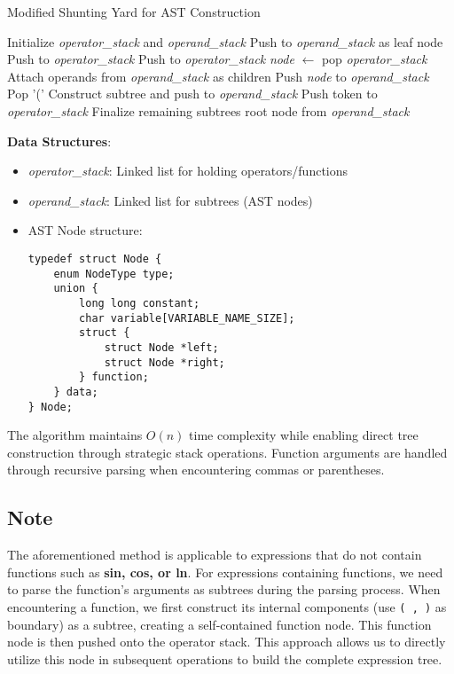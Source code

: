 \documentclass{report}
\begin{document}
\begin{algorithm}[H]
\caption{Modified Shunting Yard for AST Construction}
\begin{algorithmic}[1]
\State Initialize \textit{operator\_stack} and \textit{operand\_stack}
        \State Push to \textit{operand\_stack} as leaf node
        \State Push to \textit{operator\_stack}
        \State Push to \textit{operator\_stack}
            \State \textit{node} $\gets$ pop \textit{operator\_stack}
            \State Attach operands from \textit{operand\_stack} as children
            \State Push \textit{node} to \textit{operand\_stack}
        \EndWhile
        \State Pop '('
    \Else {}
            \State Construct subtree and push to \textit{operand\_stack}
        \EndWhile
        \State Push token to \textit{operator\_stack}
    \EndIf
\EndFor
{}
    \State Finalize remaining subtrees
\EndWhile
\State \Return root node from \textit{operand\_stack}
\end{algorithmic}
\end{algorithm}

\textbf{Data Structures}:
\begin{itemize}
    \item \textit{operator\_stack}: Linked list for holding operators/functions
    \item \textit{operand\_stack}: Linked list for subtrees (AST nodes)
    \item AST Node structure:
    \begin{verbatim}
typedef struct Node {
    enum NodeType type;
    union {
        long long constant;
        char variable[VARIABLE_NAME_SIZE];
        struct {
            struct Node *left;
            struct Node *right;
        } function;
    } data;
} Node;
    \end{verbatim}
\end{itemize}

The algorithm maintains $O(n)$ time complexity while enabling direct tree construction through strategic stack operations. Function arguments are handled through recursive parsing when encountering commas or parentheses.

\subsection*{Note}
The aforementioned method is applicable to expressions that do not contain functions such as \textbf{sin, cos, or ln}. For expressions containing functions, we need to parse the function's arguments as subtrees during the parsing process. When encountering a function, we first construct its internal components (use \texttt{( , )} as boundary) as a subtree, creating a self-contained function node. This function node is then pushed onto the operator stack. This approach allows us to directly utilize this node in subsequent operations to build the complete expression tree.
\end{document}
